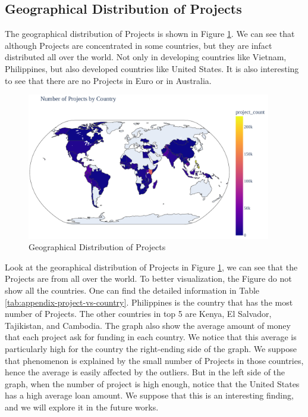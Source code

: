 \subsection{Geographical Distribution of Projects}

The geographical distribution of Projects is shown in Figure \ref{fig:map-number-project-by-country}.
We can see that although Projects are concentrated in some countries, but they are infact distributed all over the world.
Not only in developing countries like Vietnam, Philippines,
but also developed countries like United States.
It is also interesting to see that there are no Projects in Euro or in Australia.


\begin{figure}[H]
	\centering
	\includegraphics[width=0.95\textwidth]{images/project-vs-country-map.pdf}
	\caption{Geographical Distribution of Projects}
	\label{fig:map-number-project-by-country}
\end{figure}


Look at the georaphical distribution of Projects in Figure \ref{fig:map-number-project-by-country},
we can see that the Projects are from all over the world.
To better visualization, the Figure do not show all the countries.
One can find the detailed information in Table \ref{tab:appendix-project-vs-country}.
Philippines is the country that has the most number of Projects.
The other countries in top 5 are Kenya, El Salvador, Tajikistan, and Cambodia.
The graph also show the average amount of money that each project ask for funding in each country.
We notice that this average is particularly high for the country the right-ending side of the graph.
We suppose that phenomenon is explained by the small number of Projects in those countries,
hence the average is easily affected by the outliers.
But in the left side of the graph, when the number of project is high enough,
notice that the United States has a high average loan amount.
We suppose that this is an interesting finding, and we will explore it in the future works.


